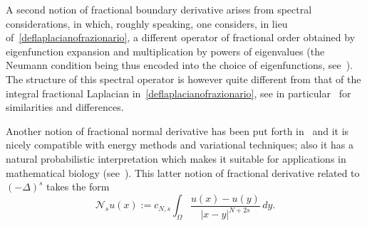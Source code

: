 \documentclass[12pt,a4paper,intlimits,sumlimits]{amsart}
\def \Ns {\mathscr{N}_{s}}
\theoremstyle{definition}
\theoremstyle{plain}
\numberwithin{equation}{section}
\begin{document}
A second notion of fractional boundary derivative arises from spectral considerations,
in which, roughly speaking, one considers, in lieu of~\eqref{deflaplacianofrazionario}, a different
operator of fractional order obtained by eigenfunction expansion and multiplication by powers of eigenvalues (the Neumann condition being thus encoded into the choice of eigenfunctions, see~\cite{MR2754080, MR3082317, MR3385190}).
The structure of this spectral operator is however quite different from that
of the integral fractional Laplacian in~\eqref{deflaplacianofrazionario}, see in particular~\cite[Section~2.3]{MR3967804}
for similarities and differences.

Another notion of fractional normal derivative has been put forth in~\cite{MR3651008}
and it is nicely compatible with energy methods and variational techniques; also
it has a natural probabilistic interpretation which makes it suitable for applications in mathematical biology (see~\cite{MR4249816, MR4651677}). This latter notion of fractional derivative
related to~$(-\Delta)^s$ takes the form
\begin{equation}\label{defNsu}
\Ns u(x):=c_{N,s}\int_\Omega\frac{u(x)-u(y)}{|x-y|^{N+2s}}\,dy.
\end{equation}
\end{document}
